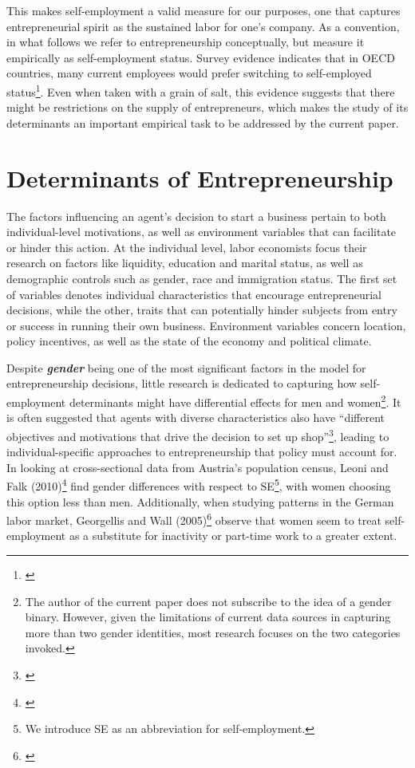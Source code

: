 This makes self-employment a valid measure for our purposes, one that captures entrepreneurial spirit as the sustained labor for one's company. As a convention, in what follows we refer to entrepreneurship conceptually, but measure it empirically as self-employment status. Survey evidence indicates that in OECD countries, many current employees would prefer switching to self-employed status\footnote{\cite{BlanchflowerOswald1998}}. Even when taken with a grain of salt, this evidence suggests that there might be restrictions on the supply of entrepreneurs, which makes the study of its determinants an important empirical task to be addressed by the current paper. 


\section{Determinants of Entrepreneurship}

The factors influencing an agent's decision to start a business pertain to both individual-level motivations, as well as environment variables that can facilitate or hinder this action. At the individual level, labor economists focus their research on factors like liquidity, education and marital status, as well as demographic controls such as gender, race and immigration status. The first set of variables denotes individual characteristics that encourage entrepreneurial decisions, while the other, traits that can potentially hinder subjects from entry or success in running their own business. Environment variables concern location, policy incentives, as well as the state of the economy and political climate. 


Despite \textbf{\textit{gender}} being one of the most significant factors in the model for entrepreneurship decisions, little research is dedicated to capturing how self-employment determinants might have differential effects for men and women\footnote{The author of the current paper does not subscribe to the idea of a gender binary. However, given the limitations of current data sources in capturing more than two gender identities, most research focuses on the two categories invoked.}. It is often suggested that agents with diverse characteristics also have ``different objectives and motivations that drive the decision to set up shop''\footnote{\cite{LeoniFalk2010}}, leading to individual-specific approaches to entrepreneurship that policy must account for. In looking at cross-sectional data from Austria's population census, Leoni and Falk (2010)\footnote{\cite{LeoniFalk2010}} find gender differences with respect to SE\footnote{ We introduce SE as an abbreviation for self-employment.}, with women choosing this option less than men. Additionally, when studying patterns in the German labor market, Georgellis and Wall (2005)\footnote{\cite{GeorgellisWall2005}} observe that women seem to treat self-employment as a substitute for inactivity or part-time work to a greater extent. 


